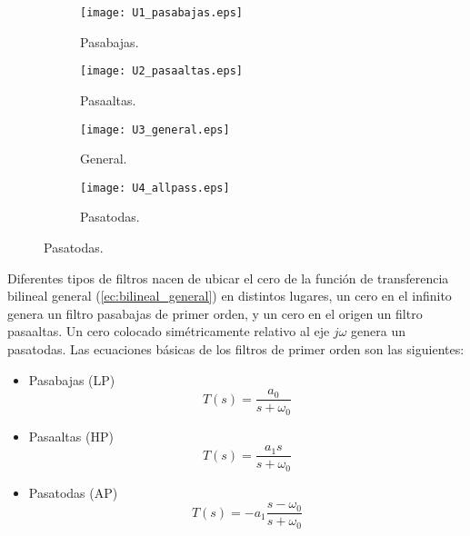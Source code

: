 	\begin{figure}[!ht]
	\centering   
	\caption{Singularidades de filtros de primer orden en el plano $s$.}
	\label{fig:primer_orden_plano_s}
		\begin{subfigure}{0.48\textwidth}
			\centering   
			\texttt{[image: U1\_pasabajas.eps]} 
			\caption{Pasabajas.}
			\label{fig:U1_pasabajas}
		\end{subfigure}
		\begin{subfigure}{0.48\textwidth}
			\centering   
			\texttt{[image: U2\_pasaaltas.eps]}
			\caption{Pasaaltas.}
			\label{fig:U2_pasaaltas}
		\end{subfigure}
		\begin{subfigure}{0.48\textwidth}
			\centering   
			\texttt{[image: U3\_general.eps]} 
			\caption{General.}
			\label{fig:U3_general}
		\end{subfigure}
		\begin{subfigure}{0.48\textwidth}
			\centering   
			\texttt{[image: U4\_allpass.eps]}
			\caption{Pasatodas.}
			\label{fig:U4_allpass}
		\end{subfigure}
	\end{figure}
	
	Diferentes tipos de filtros nacen de ubicar el cero de la función de transferencia bilineal general (\ref{ec:bilineal_general}) en distintos lugares, un cero en el infinito genera un filtro pasabajas de primer orden, y un cero en el origen un filtro pasaaltas. Un cero colocado simétricamente relativo al eje $j\omega$ genera un pasatodas. Las ecuaciones básicas de los filtros de primer orden son las siguientes:
	
	
	\begin{itemize}
		\item Pasabajas (LP)
		\begin{equation}
			T(s) = \frac{a_{0}}{s + \omega_{0}}
		\end{equation}
	
		\item Pasaaltas (HP)
		\begin{equation}
			T(s) = \frac{a_{1}s}{s + \omega_{0}}
		\end{equation}
		
		\item Pasatodas (AP)
		\begin{equation}
			T(s) = -a_{1} \frac{s - \omega_{0}}{s + \omega_{0}}
		\end{equation}
	\end{itemize}
	

